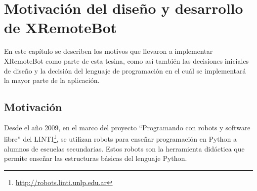 \chapter{Motivación del diseño y desarrollo de XRemoteBot}\label{cha:motivacion}

En este capítulo se describen los motivos que llevaron a implementar XRemoteBot
como
parte de esta tesina, como así también las decisiones
iniciales de
diseño y la decisión del lenguaje de programación en el cuál se implementará
la mayor
parte de la aplicación.


\section{Motivación}\label{sec:motivacion}
Desde el año 2009, en el marco del proyecto ``Programando con robots y
software libre'' del LINTI\footnote{\url{http://robots.linti.unlp.edu.ar}},
se utilizan robots para enseñar programación en Python a alumnos de escuelas
secundarias. Estos robots son la herramienta didáctica que permite enseñar
las estructuras básicas del lenguaje Python.

